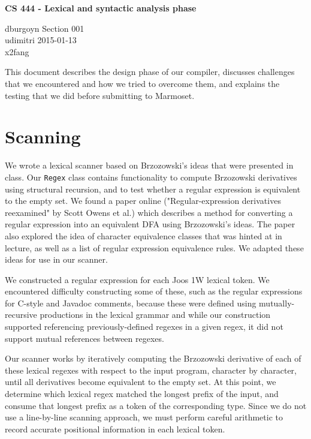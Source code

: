\documentclass[12pt]{article}
\newcommand{\code}[1]{\texttt{#1}}
\begin{document}
\begin{center}
\textbf{\large{}CS 444 - Lexical and syntactic analysis phase}
\end{center}

\begin{flushleft}
dburgoyn \textbf{\hfill{}} Section 001 \\
udimitri \textbf{\hfill{}} 2015-01-13 \\
x2fang \\
\end{flushleft}


This document describes the design phase of our compiler, discusses challenges that we encountered and how we tried to overcome them, and explains the testing that we did before submitting to Marmoset.

\section{Scanning}

We wrote a lexical scanner based on Brzozowski's ideas that were presented in class.  Our \code{Regex} class contains functionality to compute Brzozowski derivatives using structural recursion, and to test whether a regular expression is equivalent to the empty set.  We found a paper online ("Regular-expression derivatives reexamined" by Scott Owens et al.) which describes a method for converting a regular expression into an equivalent DFA using Brzozowski's ideas.  The paper also explored the idea of character equivalence classes that was hinted at in lecture, as well as a list of regular expression equivalence rules.  We adapted these ideas for use in our scanner.

We constructed a regular expression for each Joos 1W lexical token.  We encountered difficulty constructing some of these, such as the regular expressions for C-style and Javadoc comments, because these were defined using mutually-recursive productions in the lexical grammar and while our construction supported referencing previously-defined regexes in a given regex, it did not support mutual references between regexes.

Our scanner works by iteratively computing the Brzozowski derivative of each of these lexical regexes with respect to the input program, character by character, until all derivatives become equivalent to the empty set.  At this point, we determine which lexical regex matched the longest prefix of the input, and consume that longest prefix as a token of the corresponding type.  Since we do not use a line-by-line scanning approach, we must perform careful arithmetic to record accurate positional information in each lexical token.
\end{document}

